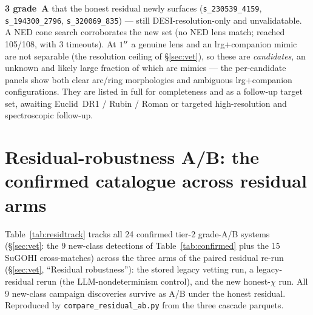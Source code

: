 \documentclass[11pt,letterpaper]{article}
\begin{document}
\textbf{3 grade~A} that the honest residual newly surfaces (\texttt{s\_230539\_4159},
\texttt{s\_194300\_2796}, \texttt{s\_320069\_835}) --- still DESI-resolution-only and unvalidatable. A NED
cone search corroborates the new set (no NED lens match; reached 105/108, with 3 timeouts). At $1^{\prime\prime}$ a genuine lens and an lrg+companion mimic
are not separable (the resolution ceiling of \S\ref{sec:vet}), so these are \emph{candidates}, an
unknown and likely large fraction of which are mimics --- the per-candidate panels show both clear arc/ring
morphologies and ambiguous lrg+companion configurations. They are listed in full for completeness and
as a follow-up target set, awaiting Euclid~DR1 / Rubin / Roman or targeted high-resolution and
spectroscopic follow-up.



\clearpage
\section{Residual-robustness A/B: the confirmed catalogue across residual arms}
\label{app:residtrack}
Table~\ref{tab:residtrack} tracks all 24 confirmed tier-2 grade-A/B systems (\S\ref{sec:vet}: the 9
new-class detections of Table~\ref{tab:confirmed} plus the 15 SuGOHI cross-matches) across the three
arms of the paired residual re-run (\S\ref{sec:vet}, ``Residual robustness''): the stored legacy vetting
run, a legacy-residual rerun (the LLM-nondeterminism control), and the new honest-$\chi$ run. All 9
new-class campaign discoveries survive as A/B under the honest residual. Reproduced by
\texttt{compare\_residual\_ab.py} from the three cascade parquets.

\end{document}
